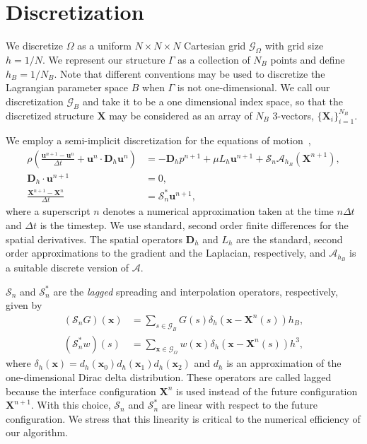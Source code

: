 \documentclass[preprint,12pt]{elsarticle}
\newcommand{\B}[1]{\mathbf{#1}}
\newcommand{\C}[1]{\mathcal{#1}}
\begin{document}
\section{Discretization}
\label{Sec:discretization}
We discretize $\Omega$ as a uniform $N\times N\times N$ Cartesian grid $\C{G}_\Omega$ with grid size $h=1/N$. We represent our structure $\Gamma$ as a collection of $N_B$ points and define $h_B=1/N_B$. Note that different conventions may be used to discretize the Lagrangian parameter space $B$ when $\Gamma$ is not one-dimensional. We call our discretization $\C{G}_B$ and take it to be a one dimensional index space, so that the discretized structure $\B{X}$ may be considered as an array of $N_B$ $3$-vectors, $\{\B{X}_i\}_{i=1}^{N_B}$. 

We employ a semi-implicit discretization for the equations of motion~\cite{Peskin77}, 
\begin{align}
\rho\left(\frac{\B{u}^{n+1}-\B{u}^n}{\Delta t} + \B{u}^n\cdot\B{D}_h\B{u}^n\right) &= -\B{D}_h p^{n+1}+ \mu L_h \B{u}^{n+1} + \C{S}_n\C{A}_{h_B}(\B{X}^{n+1}), \label{eq:dmoment} \\
\B{D}_h \cdot \B{u}^{n+1} &= 0, \label{eq:ddivergence} \\
\frac{\B{X}^{n+1}-\B{X}^n}{\Delta t} &= \C{S}^*_n\B{u}^{n+1}, \label{eq:Xt}
\end{align}
where a superscript $n$ denotes a numerical approximation taken at the time $n \Delta t$ and $\Delta t$ is the timestep. We use standard,  second order finite differences for the spatial derivatives. The spatial operators $\B{D}_h$ and $L_h$ are the standard,  second order approximations to the gradient and the Laplacian, respectively, and $\C{A}_{h_B}$ is a suitable discrete version of $\C{A}$.

$\C{S}_n$ and $ \C{S}^*_n$ are the  {\em lagged} spreading and interpolation operators, respectively,  given by
\begin{align}
(\C{S}_n G) (\B{x})&= \sum_{s \in \C{G}_B }G(s) \delta_h(\B{x}-\B{X}^n(s))h_B,
\label{eq:S} \\
(\C{S}^*_n w)(s) &= \sum_{ \B{x} \in \C{G}_\Omega} w(\B{x})\delta_h(\B{x}-\B{X}^n(s))h^3,
\label{eq:S*}
\end{align}
where $\delta_h(\B{x}) = d_h(\B{x}_0)d_h(\B{x}_1)d_h(\B{x}_2)$ and $d_h$ is an approximation of the one-dimensional Dirac delta distribution. 
These operators are called lagged because the interface configuration $\B{X}^n$ is used 
instead of the future configuration $\B{X}^{n+1}$. With this choice,  $\C{S}_n$ and $\C{S}^*_n$ are linear with respect to the future configuration. We stress that this linearity is critical to the numerical efficiency of our algorithm.
\end{document}

